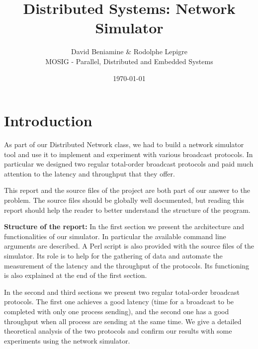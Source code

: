 \documentclass[a4paper]{article}
\begin{document}
\title{Distributed Systems: Network Simulator}
\author{David Beniamine \& Rodolphe Lepigre\\ MOSIG - Parallel, Distributed and Embedded Systems}

\date{\today}
\maketitle%
\begin{center}
    \tableofcontents%
\end{center}
\newpage%



\section*{Introduction}
As part of our Distributed Network class, we had to build a network simulator
tool and use it to implement and experiment with various broadcast protocols.
In particular we designed two regular total-order broadcast protocols and paid
much attention to the latency and throughput that they offer.

This report and the source files of the project are both part of our answer to
the problem. The source files should be globally well documented, but reading
this report should help the reader to better understand the structure of the
program.
\bigskip

\noindent\textbf{Structure of the report:} In the first section we present the
architecture and functionalities of our simulator. In particular the available
command line arguments are described. A Perl script is also provided with the
source files of the simulator. Its role is to help for the gathering of data
and automate the measurement of the latency and the throughput of the
protocols. Its functioning is also explained at the end of the first section.

In the second and third sections we present two regular total-order broadcast
protocols. The first one achieves a good latency (time for a broadcast to be
completed with only one process sending), and the second one has a good
throughput when all process are sending at the same time. We give a detailed
theoretical analysis of the two protocols and confirm our results with some
experiments using the network simulator.
\end{document}
